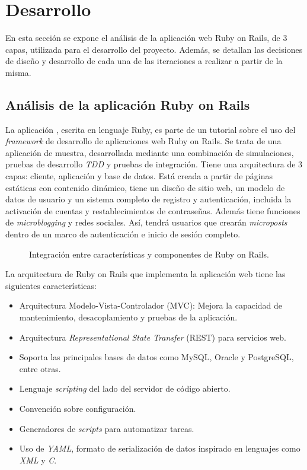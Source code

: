 \chapter{Desarrollo}
\label{cha:development}

En esta sección se expone el análisis de la aplicación web Ruby on Rails, de 3 capas, utilizada para el desarrollo del proyecto. Además, se detallan las decisiones de diseño y desarrollo de cada una de las iteraciones a realizar a partir de la misma.

\section{Análisis de la aplicación Ruby on Rails}

La aplicación , escrita en lenguaje Ruby, es parte de un tutorial sobre el uso del \textit{framework} de desarrollo de aplicaciones web Ruby on Rails. Se trata de una aplicación de muestra, desarrollada mediante una combinación de simulaciones, pruebas de desarrollo \textit{TDD} y pruebas de integración. Tiene una arquitectura de 3 capas: cliente, aplicación y base de datos. Está creada a partir de páginas estáticas con contenido dinámico, tiene un diseño de sitio web, un modelo de datos de usuario y un sistema completo de registro y autenticación, incluida la activación de cuentas y restablecimientos de contraseñas. Además tiene funciones de \textit{microblogging} y redes sociales. Así, tendrá usuarios que crearán \textit{microposts} dentro de un marco de autenticación e inicio de sesión completo.

\begin{figure}[H]
\caption{Integración entre características y componentes de Ruby on Rails.}
\end{figure}

La arquitectura de Ruby on Rails que implementa la aplicación web tiene las siguientes características:
\begin{itemize}
\item Arquitectura Modelo-Vista-Controlador (MVC): Mejora la capacidad de mantenimiento, desacoplamiento y pruebas de la aplicación.
\item Arquitectura \textit{Representational State Transfer} (REST) para servicios web.
\item Soporta las principales bases de datos como MySQL, Oracle y PostgreSQL, entre otras.
\item Lenguaje \textit{scripting} del lado del servidor de código abierto.
\item Convención sobre configuración.
\item Generadores de \textit{scripts} para automatizar tareas.
\item Uso de \textit{YAML}, formato de serialización de datos inspirado en lenguajes como \textit{XML} y \textit{C}.
\end{itemize}


